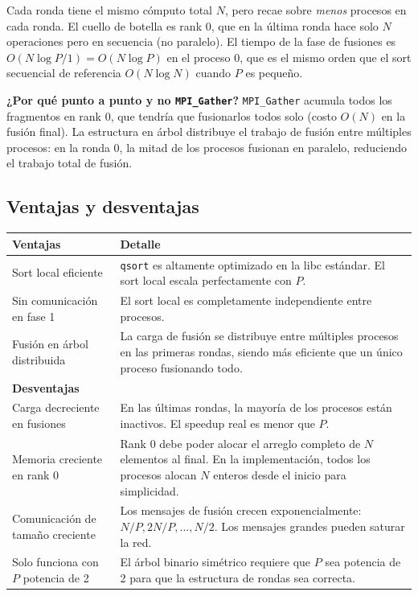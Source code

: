 \documentclass[12pt,a4paper]{article}
\begin{document}
Cada ronda tiene el mismo cómputo total $N$, pero recae sobre \textit{menos} procesos
en cada ronda. El cuello de botella es rank 0, que en la última ronda hace solo $N$
operaciones pero en secuencia (no paralelo). El tiempo de la fase de fusiones es
$O(N \log P / 1) = O(N \log P)$ en el proceso 0, que es el mismo orden que el sort
secuencial de referencia $O(N \log N)$ cuando $P$ es pequeño.

\textbf{¿Por qué punto a punto y no \texttt{MPI\_Gather}?}
\texttt{MPI\_Gather} acumula todos los fragmentos en rank 0, que tendría que fusionarlos
todos solo (costo $O(N)$ en la fusión final). La estructura en árbol distribuye el
trabajo de fusión entre múltiples procesos: en la ronda 0, la mitad de los procesos
fusionan en paralelo, reduciendo el trabajo total de fusión.

\subsection{Ventajas y desventajas}

\begin{longtable}{L{4cm} L{10cm}}
\toprule
\textbf{Ventajas} & \textbf{Detalle} \\
\midrule
\endhead
Sort local eficiente & \texttt{qsort} es altamente optimizado en la libc estándar.
  El sort local escala perfectamente con $P$. \\[4pt]
Sin comunicación en fase 1 & El sort local es completamente independiente
  entre procesos. \\[4pt]
Fusión en árbol distribuida & La carga de fusión se distribuye entre múltiples
  procesos en las primeras rondas, siendo más eficiente que un único proceso
  fusionando todo. \\
\midrule
\textbf{Desventajas} & \\
\midrule
Carga decreciente en fusiones & En las últimas rondas, la mayoría de los procesos
  están inactivos. El speedup real es menor que $P$. \\[4pt]
Memoria creciente en rank 0 & Rank 0 debe poder alocar el arreglo completo de
  $N$ elementos al final. En la implementación, todos los procesos alocan $N$
  enteros desde el inicio para simplicidad. \\[4pt]
Comunicación de tamaño creciente & Los mensajes de fusión crecen exponencialmente:
  $N/P, 2N/P, \ldots, N/2$. Los mensajes grandes pueden saturar la red. \\[4pt]
Solo funciona con $P$ potencia de 2 & El árbol binario simétrico requiere que $P$
  sea potencia de 2 para que la estructura de rondas sea correcta. \\
\bottomrule
\end{longtable}
\end{document}
